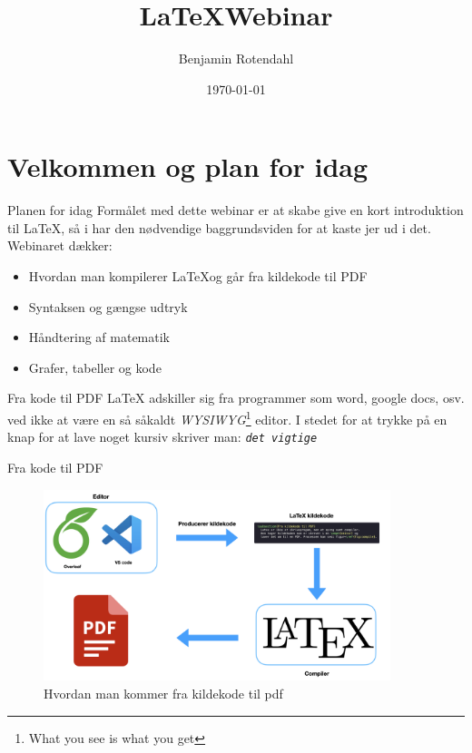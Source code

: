 \documentclass{beamer}
\title{\LaTeX Webinar}
\date{\today}
\author{Benjamin Rotendahl}
\institute{Study Now}
\newcommand{\tex}[1] {
  \texttt{#1}
}
\begin{document}
\maketitle
\section{Velkommen og plan for idag}
 \begin{frame}{Planen for idag}
   Formålet med dette webinar er at skabe give en kort introduktion til LaTeX,
   så i har den nødvendige baggrundsviden for at kaste jer ud i det.
   Webinaret dækker:
   \begin{itemize}
     \item Hvordan man kompilerer \LaTeX og går fra kildekode til PDF \pause
     \item Syntaksen og gængse udtryk \pause
     \item Håndtering af matematik \pause
     \item Grafer, tabeller og kode
   \end{itemize}
 \end{frame}

 \begin{frame}{Fra kode til PDF}
   \LaTeX{} adskiller sig fra programmer som word, google docs, osv. ved ikke at
   være en så såkaldt \emph{WYSIWYG}\footnote{What you see is what you get} editor.
   \pause
   I stedet for at trykke på en knap for at lave noget kursiv skriver man:
   \centering\tex{\emph{det vigtige}}
 \end{frame}

 \begin{frame}{Fra kode til PDF}
   \begin{figure}[h]
     \centering\includegraphics[width=0.9\textwidth]{../assets/compile.png}
     \caption{Hvordan man kommer fra kildekode til pdf}\label{fig:compile}
   \end{figure}
 \end{frame}
\end{document}
